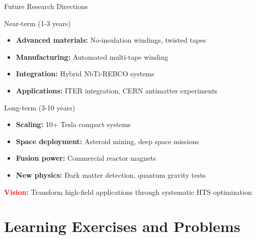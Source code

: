 \documentclass[aspectratio=169,xcolor={table,dvipsnames}]{beamer}
\newcommand{\highlight}[1]{\textcolor{red}{\textbf{#1}}}
\begin{document}
\begin{frame}{Future Research Directions}
    \begin{block}{Near-term (1-3 years)}
        \begin{itemize}
            \item \textbf{Advanced materials:} No-insulation windings, twisted tapes
            \item \textbf{Manufacturing:} Automated multi-tape winding
            \item \textbf{Integration:} Hybrid NbTi-REBCO systems
            \item \textbf{Applications:} ITER integration, CERN antimatter experiments
        \end{itemize}
    \end{block}
    
    \begin{block}{Long-term (3-10 years)}
        \begin{itemize}
            \item \textbf{Scaling:} 10+ Tesla compact systems
            \item \textbf{Space deployment:} Asteroid mining, deep space missions
            \item \textbf{Fusion power:} Commercial reactor magnets
            \item \textbf{New physics:} Dark matter detection, quantum gravity tests
        \end{itemize}
    \end{block}
    
    \vspace{0.3cm}
    \highlight{Vision:} Transform high-field applications through systematic HTS optimization
\end{frame}

\section{Learning Exercises and Problems}
\end{document}
